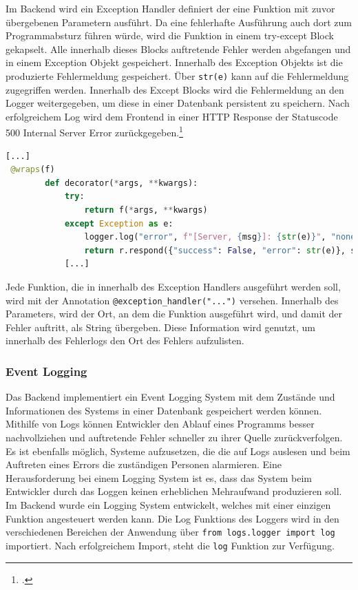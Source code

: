 Im Backend wird ein Exception Handler definiert der eine Funktion mit zuvor übergebenen Parametern ausführt. Da eine fehlerhafte Ausführung auch dort zum Programmabsturz führen würde, wird die Funktion in einem try-except Block gekapselt. Alle innerhalb dieses Blocks auftretende Fehler werden abgefangen und in einem Exception Objekt gespeichert. Innerhalb des Exception Objekts ist die produzierte Fehlermeldung gespeichert. Über \texttt{str(e)} kann auf die Fehlermeldung zugegriffen werden. Innerhalb des Except Blocks wird die Fehlermeldung an den Logger weitergegeben, um diese in einer Datenbank persistent zu speichern. Nach erfolgreichem Log wird dem Frontend in einer HTTP Response der Statuscode 500 \glqq Internal Server Error\grqq{} zurückgegeben.\footcite{fielding1999rfc2616}

\begin{lstlisting}[language=Python]
[...]
 @wraps(f)
        def decorator(*args, **kwargs):
            try:
                return f(*args, **kwargs)
            except Exception as e:
                logger.log("error", f"[Server, {msg}]: {str(e)}", "none")
                return r.respond({"success": False, "error": str(e)}, status=500)
            [...]
\end{lstlisting}

Jede Funktion, die in innerhalb des Exception Handlers ausgeführt werden soll, wird mit der Annotation \texttt{@exception\_{}handler("...")} versehen. Innerhalb des Parameters, wird der Ort, an dem die Funktion ausgeführt wird, und damit der Fehler auftritt, als String übergeben. Diese Information wird genutzt, um innerhalb des Fehlerlogs den Ort des Fehlers aufzulisten.

\subsubsection{Event Logging}
Das Backend implementiert ein Event Logging System mit dem Zustände und Informationen des Systems in einer Datenbank gespeichert werden können. Mithilfe von Logs können Entwickler den Ablauf eines Programms besser nachvollziehen und auftretende Fehler schneller zu ihrer Quelle zurückverfolgen. Es ist ebenfalls möglich, Systeme aufzusetzen, die die auf Logs auslesen und beim Auftreten eines Errors die zuständigen Personen alarmieren. Eine Herausforderung bei einem Logging System ist es, dass das System beim Entwickler durch das Loggen keinen erheblichen Mehraufwand produzieren soll. Im Backend wurde ein Logging System entwickelt, welches mit einer einzigen Funktion angesteuert werden kann. Die Log Funktions des Loggers wird in den verschiedenen Bereichen der Anwendung über \texttt{from logs.logger import log} importiert. Nach erfolgreichem Import, steht die \texttt{log} Funktion zur Verfügung. 

